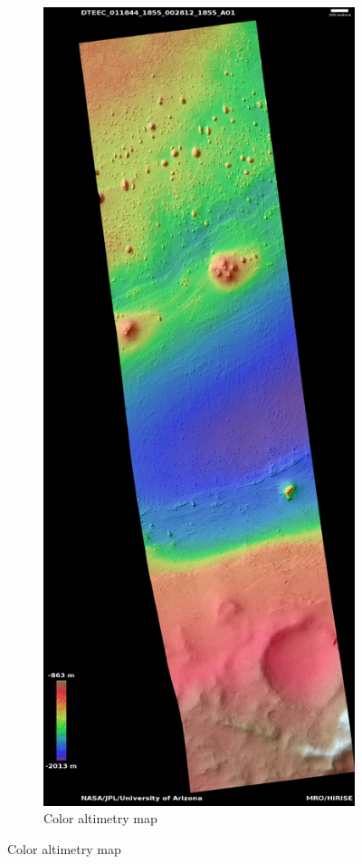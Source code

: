 \documentclass[12pt]{article}
\begin{document}
\begin{figure}[h!]
\begin{subfigure}[t]{0.33\textwidth}
    \includegraphics[height=0.5\paperheight]{figures/maps/ESP_011844_1855/DTEEC_011844_1855_002812_1855_A01.jpg}
    \caption{Color altimetry map}
    \label{fig:southwest_dtm}
  \end{subfigure}

\end{figure}
\end{document}
